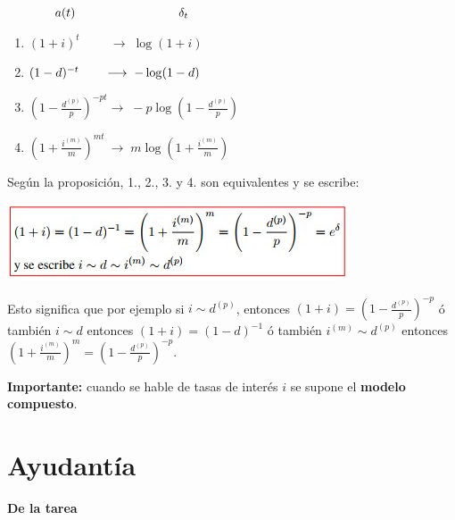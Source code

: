 \documentclass[
]{book}
\theoremstyle{definition}
\theoremstyle{definition}
\theoremstyle{definition}
\theoremstyle{definition}
\theoremstyle{remark}
\begin{document}
\(\hspace{1.3cm} a(t) \hspace{3cm} \delta_t\)

\begin{enumerate}
\def\labelenumi{\arabic{enumi}.}
\item
  \((1+i)^t \hspace{1cm} \longrightarrow \; \log(1+i)\)
\item
  \((1-d)^{-t} \hspace{0.7cm} \longrightarrow \; -\log(1-d)\)
\item
  \(\left(1-\frac{d^{(p)}}{p} \right)^{-pt} \longrightarrow \; -p\log\left(1 - \frac{d^{(p)}}{p}\right)\)
\item
  \(\left(1 + \frac{i^{(m)}}{m} \right)^{mt} \: \longrightarrow \; m\log\left(1 + \frac{i^{(m)}}{m} \right)\)
\end{enumerate}

Según la proposición, 1., 2., 3. y 4. son equivalentes y se escribe:

\includegraphics{images/10.jpg}

Esto significa que por ejemplo si \(i\sim d^{(p)}\), entonces \((1+i) = \left( 1 - \frac{d^{(p)}}{p}\right)^{-p}\) ó también \(i\sim d\) entonces \((1+i) = (1-d)^{-1}\) ó también \(i^{(m)} \sim d^{(p)}\) entonces \(\left(1+\frac{i^{(m)}}{m} \right)^m = \left( 1 - \frac{d^{(p)}}{p}\right)^{-p}\).

\textbf{Importante:} cuando se hable de tasas de interés \(i\) se supone el \textbf{modelo compuesto}.

\hypertarget{ayudantuxeda-1}{%
\section{Ayudantía}\label{ayudantuxeda-1}}

\textbf{De la tarea}
\end{document}
